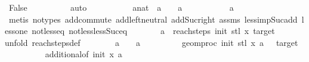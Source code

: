 \begin{isabellebody}
\ False\isanewline
\ \ \ \ \ \ \ \ \isamarkupfalse%
\ auto\isanewline
\ \ \ \ \isamarkupfalse%
\isanewline
\ \ \ \ \isamarkupfalse%
\ a{\isacharprime}{\kern0pt}{\isacharcolon}{\kern0pt}{\isacharcolon}{\kern0pt}nat\ \ {\isachardoublequoteopen}a{\isacharprime}{\kern0pt}\ {\isacharplus}{\kern0pt}\ {}\ {\isacharequal}{\kern0pt}\ a\ {\isachardoublequoteclose}\isanewline
\ \ \ \ \ \ \ \ \isamarkupfalse%
\ {\isacartoucheopen}a\ {\isasymnoteq}\ {}{\isacartoucheclose}\ \isanewline
\ \ \ \ \ \ \ \ \isamarkupfalse%
\ {\isacharparenleft}{\kern0pt}metis\ {\isacharparenleft}{\kern0pt}no{\isacharunderscore}{\kern0pt}types{\isacharparenright}{\kern0pt}\ add{\isachardot}{\kern0pt}commute\ add{\isachardot}{\kern0pt}left{\isacharunderscore}{\kern0pt}neutral\ add{\isacharunderscore}{\kern0pt}Suc{\isacharunderscore}{\kern0pt}right\ assms\ less{\isacharunderscore}{\kern0pt}imp{\isacharunderscore}{\kern0pt}Suc{\isacharunderscore}{\kern0pt}add\ less{\isacharunderscore}{\kern0pt}one\ not{\isacharunderscore}{\kern0pt}less{\isacharunderscore}{\kern0pt}eq\ not{\isacharunderscore}{\kern0pt}less{\isacharunderscore}{\kern0pt}less{\isacharunderscore}{\kern0pt}Suc{\isacharunderscore}{\kern0pt}eq{\isacharparenright}{\kern0pt}\isanewline
\ \ \ \ \isamarkupfalse%
\ \isamarkupfalse%
\ {\isachardoublequoteopen}a{\isacharprime}{\kern0pt}\ {\isasymin}\ reach{\isacharunderscore}{\kern0pt}steps\ init{\isacharprime}{\kern0pt}\ {\isacharparenleft}{\kern0pt}stl\ x{\isacharparenright}{\kern0pt}\ target{\isachardoublequoteclose}\isanewline
\ \ \ \ \isamarkupfalse%
{\isacharparenleft}{\kern0pt}unfold\ reach{\isacharunderscore}{\kern0pt}steps{\isacharunderscore}{\kern0pt}def{\isacharparenright}{\kern0pt}\isanewline
\ \ \ \ \ \ \isamarkupfalse%
\ {\isachardoublequoteopen}a{\isacharprime}{\kern0pt}\ {\isacharplus}{\kern0pt}\ {}\ {\isacharequal}{\kern0pt}\ a{\isachardoublequoteclose}\isanewline
\ \ \ \ \ \ \isamarkupfalse%
\ \isamarkupfalse%
\ {\isachardoublequoteopen}geom{\isacharunderscore}{\kern0pt}proc\ init{\isacharprime}{\kern0pt}\ {\isacharparenleft}{\kern0pt}stl\ x{\isacharparenright}{\kern0pt}\ a{\isacharprime}{\kern0pt}\ {\isasymin}\ {\isacharbraceleft}{\kern0pt}{}{\isacharcomma}{\kern0pt}\ target{\isacharbraceright}{\kern0pt}{\isachardoublequoteclose}\isanewline
\ \ \ \ \ \ \ \ \isamarkupfalse%
\ additional{}{\isacharbrackleft}{\kern0pt}of\ init\ x\ a{\isacharprime}{\kern0pt}{\isacharbrackright}{\kern0pt}\ \isanewline

\end{isabellebody}
